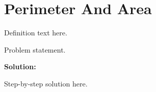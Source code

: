 \section{Perimeter And Area}


\begin{definition}[Term]
Definition text here.
\end{definition}

\begin{example}
Problem statement.

\textbf{Solution:}

Step-by-step solution here.
\end{example}
